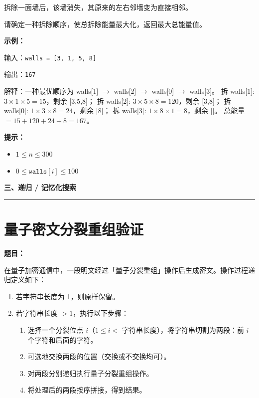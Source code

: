 \documentclass[12pt, a4paper]{article}
\newcommand{\category}[1]{%
  \vspace{1.2cm}
  {\noindent\Large\bfseries #1}
  \vspace{0.2em}\par
  \noindent\rule{\textwidth}{0.8pt}
  \vspace{0.2em}
}
\begin{document}
拆除一面墙后，该墙消失，其原来的左右邻墙变为直接相邻。

请确定一种拆除顺序，使总拆除能量最大化，返回最大总能量值。

\textbf{示例：}

输入：\texttt{walls = [3, 1, 5, 8]}

输出：\texttt{167}

解释：一种最优顺序为 walls[1] $\to$ walls[2] $\to$ walls[0] $\to$ walls[3]。
拆 walls[1]: $3 \times 1 \times 5 = 15$，剩余 [3,5,8]；
拆 walls[2]: $3 \times 5 \times 8 = 120$，剩余 [3,8]；
拆 walls[0]: $1 \times 3 \times 8 = 24$，剩余 [8]；
拆 walls[3]: $1 \times 8 \times 1 = 8$，剩余 []。
总能量 $= 15+120+24+8 = 167$。

\textbf{提示：}
\begin{itemize}[leftmargin=2em]
  \item $1 \leq n \leq 300$
  \item $0 \leq \texttt{walls}[i] \leq 100$
\end{itemize}



\category{三、递归 / 记忆化搜索}

\section{量子密文分裂重组验证}

\noindent\textbf{题目：}

在量子加密通信中，一段明文经过「量子分裂重组」操作后生成密文。操作过程递归定义如下：

\begin{enumerate}[leftmargin=2em]
  \item 若字符串长度为 1，则原样保留。
  \item 若字符串长度 $> 1$，执行以下步骤：
  \begin{enumerate}[label=(\roman*)]
    \item 选择一个分裂位点 $i$（$1 \leq i < $ 字符串长度），将字符串切割为两段：前 $i$ 个字符和后面的字符。
    \item 可选地交换两段的位置（交换或不交换均可）。
    \item 对两段分别递归执行量子分裂重组操作。
    \item 将处理后的两段按序拼接，得到结果。
  \end{enumerate}
\end{enumerate}
\end{document}
